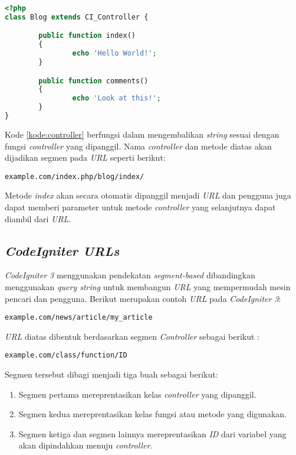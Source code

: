 \begin{lstlisting}[language=PHP, caption=Contoh \textit{controller} pada \textit{CodeIgniter 3}, label=kode:controller]
<?php
class Blog extends CI_Controller {

        public function index()
        {
                echo 'Hello World!';
        }

        public function comments()
        {
                echo 'Look at this!';
        }
}
\end{lstlisting}

Kode \ref{kode:controller} berfungsi dalam mengembalikan \textit{string} sesuai dengan fungsi \textit{controller} yang dipanggil. Nama \textit{controller} dan metode diatas akan dijadikan segmen pada \textit{URL} seperti berikut:

\begin{center}
\verb|example.com/index.php/blog/index/|
\end{center}

Metode \textit{index} akan secara otomatis dipanggil menjadi \textit{URL} dan pengguna juga dapat memberi parameter untuk metode \textit{controller} yang selanjutnya dapat diambil dari \textit{URL}.

\subsection{\textit{CodeIgniter URLs}}

\textit{CodeIgniter 3} menggunakan pendekatan \textit{segment-based} dibandingkan menggunakan \textit{query string} untuk membangun \textit{URL} yang mempermudah mesin pencari dan pengguna. Berikut merupakan contoh \textit{URL} pada \textit{CodeIgniter 3}:

\begin{center}
\verb|example.com/news/article/my_article|
\end{center}

\textit{URL} diatas dibentuk berdasarkan segmen \textit{Controller} sebagai berikut :

\begin{center}
\verb|example.com/class/function/ID|
\end{center}

Segmen tersebut dibagi menjadi tiga buah sebagai berikut:
\begin{enumerate}
\item Segmen pertama mereprentasikan kelas \textit{controller} yang dipanggil.
\item Segmen kedua mereprentasikan kelas fungsi atau metode yang digunakan.
\item Segmen ketiga dan segmen lainnya mereprentasikan \textit{ID} dari variabel yang akan dipindahkan menuju \textit{controller}.
\end{enumerate}

